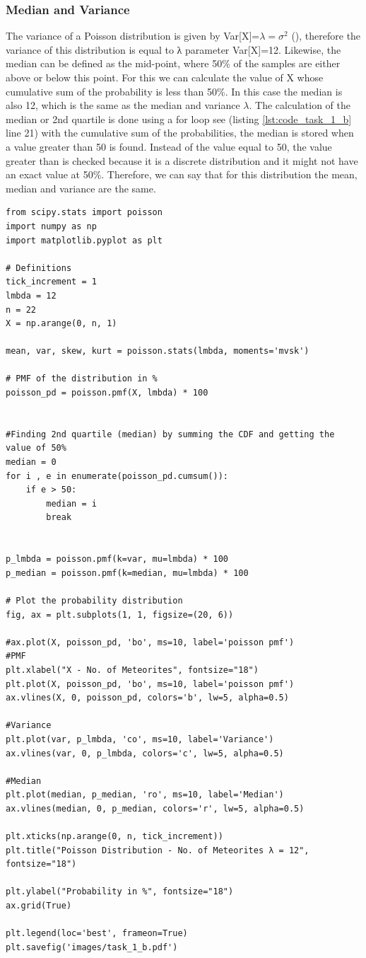 \subsubsection{Median and Variance}
The variance of a Poisson distribution is given by Var[X]=$\lambda=\sigma^2$ (\cite{hogg:2005}), therefore the variance of this distribution is equal to λ parameter Var[X]=12.
Likewise, the median can be defined as the mid-point, where 50\% of the samples are either above or below this point. For this we can calculate the value of X whose cumulative sum of the probability is less than 50\%. In this case the median is also 12, which is the same as the median and variance $\lambda$. The calculation of the median or 2nd quartile is done using a for loop see (listing \ref{lst:code_task_1_b} line 21)  with the cumulative sum of the probabilities, the median is stored when a value greater than 50 is found. Instead of the value equal to 50, the value greater than is checked because it is a discrete distribution and it might not have an exact value at 50\%. Therefore, we can say that for this distribution the mean, median and variance are the same.

\begin{lstlisting}[caption={Plotting the PMF for Poisson Distribution)},label={lst:code_task_1_b}]
from scipy.stats import poisson
import numpy as np
import matplotlib.pyplot as plt

# Definitions
tick_increment = 1
lmbda = 12
n = 22
X = np.arange(0, n, 1)

mean, var, skew, kurt = poisson.stats(lmbda, moments='mvsk')

# PMF of the distribution in %
poisson_pd = poisson.pmf(X, lmbda) * 100


#Finding 2nd quartile (median) by summing the CDF and getting the value of 50%
median = 0
for i , e in enumerate(poisson_pd.cumsum()):
    if e > 50:
        median = i
        break


p_lmbda = poisson.pmf(k=var, mu=lmbda) * 100
p_median = poisson.pmf(k=median, mu=lmbda) * 100

# Plot the probability distribution
fig, ax = plt.subplots(1, 1, figsize=(20, 6))

#ax.plot(X, poisson_pd, 'bo', ms=10, label='poisson pmf')
#PMF
plt.xlabel("X - No. of Meteorites", fontsize="18")
plt.plot(X, poisson_pd, 'bo', ms=10, label='poisson pmf')
ax.vlines(X, 0, poisson_pd, colors='b', lw=5, alpha=0.5)

#Variance
plt.plot(var, p_lmbda, 'co', ms=10, label='Variance')
ax.vlines(var, 0, p_lmbda, colors='c', lw=5, alpha=0.5)

#Median
plt.plot(median, p_median, 'ro', ms=10, label='Median')
ax.vlines(median, 0, p_median, colors='r', lw=5, alpha=0.5)

plt.xticks(np.arange(0, n, tick_increment))
plt.title("Poisson Distribution - No. of Meteorites λ = 12", fontsize="18")

plt.ylabel("Probability in %", fontsize="18")
ax.grid(True)

plt.legend(loc='best', frameon=True)
plt.savefig('images/task_1_b.pdf')

\end{lstlisting}

